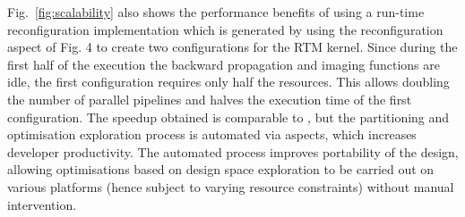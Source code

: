 Fig.~\ref{fig:scalability} also shows the performance benefits of
using a run-time reconfiguration implementation which is generated by
using the reconfiguration aspect of Fig. 4 to create two
configurations for the RTM \MAXC{} kernel. Since during the first half of
the execution the backward propagation and imaging functions are idle,
the first configuration requires only half the resources. This allows
doubling the number of parallel pipelines and halves the execution
time of the first configuration. The speedup obtained is comparable to
\cite{Xinyu:Qiwei:Luk:Qiang:Pell:2012}, but the partitioning and
optimisation exploration process is automated via aspects, which
increases developer productivity. The automated process improves
portability of the design, allowing optimisations based on design
space exploration to be carried out on various platforms (hence
subject to varying resource constraints) without manual intervention.
